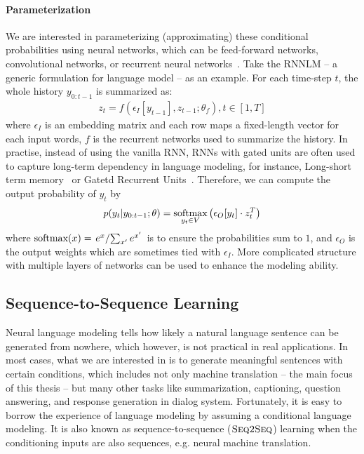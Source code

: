 \paragraph{Parameterization} 
We are interested in parameterizing (approximating) these conditional probabilities using neural networks, which can be feed-forward networks, convolutional networks, or recurrent neural networks~\citep[RNNLM, ][]{mikolov2010recurrent}. 
Take the RNNLM -- a generic formulation for language model -- as an example. For each time-step $t$, the whole history $y_{0: t-1}$ is summarized as:
\begin{equation}
    \begin{split}
         z_t = f(\epsilon_I[y_{t-1}], z_{t-1}; {\theta}_f) , t \in [1, T]
    \end{split}
\end{equation}
where $\epsilon_I$ is an embedding matrix and each row maps a fixed-length vector for each input words, $f$ is the recurrent networks used to summarize the history. In practise, instead of using the vanilla RNN, RNNs with gated units are often used to capture long-term dependency in language modeling, for instance, Long-short term memory~\citep[LSTM,][]{hochreiter1997long} or Gatetd Recurrent Units~\citep[GRU,][]{cho2014learning}.
Therefore, we can compute the output probability of $y_t$ by
\begin{equation}
    \label{cp2.eq.output}
    p(y_t|y_{0: t-1};\theta) = \mathop{\operatorname{\text{softmax}}}\limits_{y_t\in V}\left(\epsilon_O[y_t]\cdot z_t^T\right)
\end{equation}
where $\operatorname{\text{softmax}}(x) = \left. {e^x} \large / {\sum_{x'} e^{x'}} \right.$ is to ensure the probabilities sum to $1$, and $\epsilon_O$ is the output weights which are sometimes tied with $\epsilon_I$. More complicated structure with multiple layers of networks can be used to enhance the modeling ability.



\subsection{Sequence-to-Sequence Learning}
Neural language modeling tells how likely a natural language sentence can be generated from nowhere, which however, is not practical in real applications. In most cases, what we are interested in is to generate meaningful sentences with certain conditions, which includes not only machine translation -- the main focus of this thesis -- but many other tasks like summarization, captioning, question answering, and response generation in dialog system. Fortunately, it is easy to borrow the experience of language modeling by assuming a conditional language modeling. 
It is also known as sequence-to-sequence (${{\textsc{Seq2Seq}}}$) learning when the conditioning inputs are also sequences, e.g. neural machine translation.

